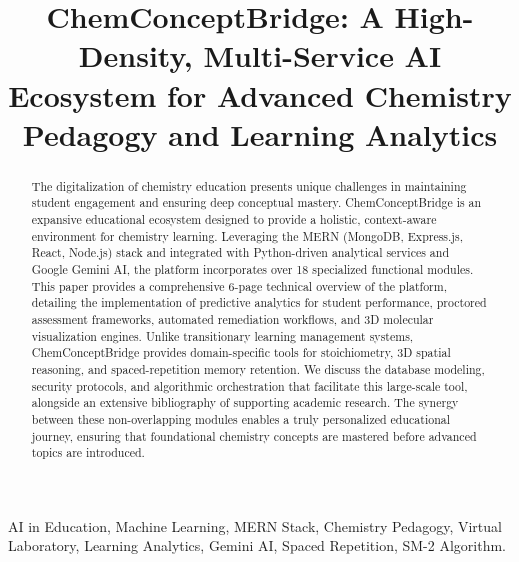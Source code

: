 \documentclass[10pt, conference]{IEEEtran}
\begin{document}
\title{ChemConceptBridge: A High-Density, Multi-Service AI Ecosystem for Advanced Chemistry Pedagogy and Learning Analytics\\
}

\author{
}

\maketitle

\begin{abstract}
The digitalization of chemistry education presents unique challenges in maintaining student engagement and ensuring deep conceptual mastery. ChemConceptBridge is an expansive educational ecosystem designed to provide a holistic, context-aware environment for chemistry learning. Leveraging the MERN (MongoDB, Express.js, React, Node.js) stack and integrated with Python-driven analytical services and Google Gemini AI, the platform incorporates over 18 specialized functional modules. This paper provides a comprehensive 6-page technical overview of the platform, detailing the implementation of predictive analytics for student performance, proctored assessment frameworks, automated remediation workflows, and 3D molecular visualization engines. Unlike transitionary learning management systems, ChemConceptBridge provides domain-specific tools for stoichiometry, 3D spatial reasoning, and spaced-repetition memory retention. We discuss the database modeling, security protocols, and algorithmic orchestration that facilitate this large-scale tool, alongside an extensive bibliography of supporting academic research. The synergy between these non-overlapping modules enables a truly personalized educational journey, ensuring that foundational chemistry concepts are mastered before advanced topics are introduced.
\end{abstract}

\begin{IEEEkeywords}
AI in Education, Machine Learning, MERN Stack, Chemistry Pedagogy, Virtual Laboratory, Learning Analytics, Gemini AI, Spaced Repetition, SM-2 Algorithm.
\end{IEEEkeywords}
\end{document}
